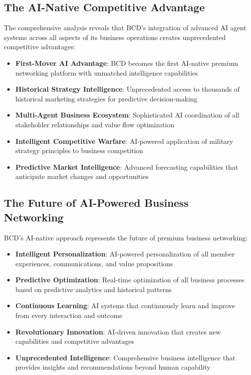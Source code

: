 \subsection{The AI-Native Competitive Advantage}

The comprehensive analysis reveals that BCD's integration of advanced AI agent systems across all aspects of its business operations creates unprecedented competitive advantages:

\begin{itemize}
    \item \textbf{First-Mover AI Advantage}: BCD becomes the first AI-native premium networking platform with unmatched intelligence capabilities
    \item \textbf{Historical Strategy Intelligence}: Unprecedented access to thousands of historical marketing strategies for predictive decision-making
    \item \textbf{Multi-Agent Business Ecosystem}: Sophisticated AI coordination of all stakeholder relationships and value flow optimization
    \item \textbf{Intelligent Competitive Warfare}: AI-powered application of military strategy principles to business competition
    \item \textbf{Predictive Market Intelligence}: Advanced forecasting capabilities that anticipate market changes and opportunities
\end{itemize}

\subsection{The Future of AI-Powered Business Networking}

BCD's AI-native approach represents the future of premium business networking:

\begin{itemize}
    \item \textbf{Intelligent Personalization}: AI-powered personalization of all member experiences, communications, and value propositions
    \item \textbf{Predictive Optimization}: Real-time optimization of all business processes based on predictive analytics and historical patterns
    \item \textbf{Continuous Learning}: AI systems that continuously learn and improve from every interaction and outcome
    \item \textbf{Revolutionary Innovation}: AI-driven innovation that creates new capabilities and competitive advantages
    \item \textbf{Unprecedented Intelligence}: Comprehensive business intelligence that provides insights and recommendations beyond human capability
\end{itemize}


